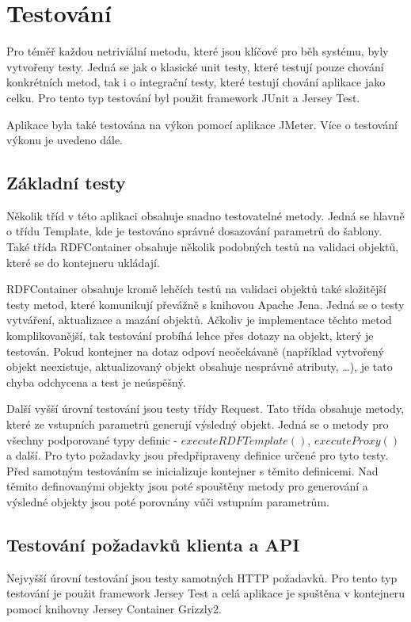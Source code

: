 \documentclass[thesis=B,czech]{FITthesis}[2012/06/26]
\begin{document}
  
  \chapter{Testování}
  Pro téměř každou netriviální metodu, které jsou klíčové pro běh systému, byly vytvořeny testy. Jedná se jak o klasické unit testy, které testují pouze chování konkrétních
  metod, tak i o integrační testy, které testují chování aplikace jako celku.  
  Pro tento typ testování byl použit framework JUnit a Jersey Test.
  
  Aplikace byla také testována na výkon pomocí aplikace JMeter. Více o testování výkonu je uvedeno dále.
  
  \section{Základní testy}
  Několik tříd v této aplikaci obsahuje snadno testovatelné metody. Jedná se hlavně o třídu Template, kde je testováno správné dosazování parametrů
  do šablony. Také třída RDFContainer obsahuje několik podobných testů na validaci objektů, které se do kontejneru ukládají. 
  
  RDFContainer obsahuje kromě lehčích testů na validaci objektů také složitější testy metod, které komunikují převážně s knihovou Apache Jena.
  Jedná se o testy vytváření, aktualizace a mazání objektů. Ačkoliv je implementace těchto metod komplikovanější, tak testování probíhá lehce přes dotazy na objekt,
  který je testován. Pokud kontejner na dotaz odpoví neočekávaně (například vytvořený objekt neexistuje, aktualizovaný objekt obsahuje nesprávné atributy, \ldots), je
  tato chyba odchycena a test je neúspěšný.
  
  Další vyšší úrovní testování jsou testy třídy Request. Tato třída obsahuje metody, které ze vstupních parametrů generují výsledný objekt. Jedná se o metody
  pro všechny podporované typy definic - $executeRDFTemplate()$, $executeProxy()$ a další. Pro tyto požadavky jsou předpřipraveny definice určené pro tyto testy.
  Před samotným testováním se inicializuje kontejner s těmito definicemi. Nad těmito definovanými objekty jsou poté spouštěny metody pro generování a výsledné
  objekty jsou poté porovnány vůči vstupním parametrům.
  
  \section{Testování požadavků klienta a API}
  Nejvyšší úrovní testování jsou testy samotných HTTP požadavků. Pro tento typ testování je použit framework Jersey Test a celá aplikace je spuštěna v kontejneru
  pomocí knihovny Jersey Container Grizzly2. 
  
\end{document}
